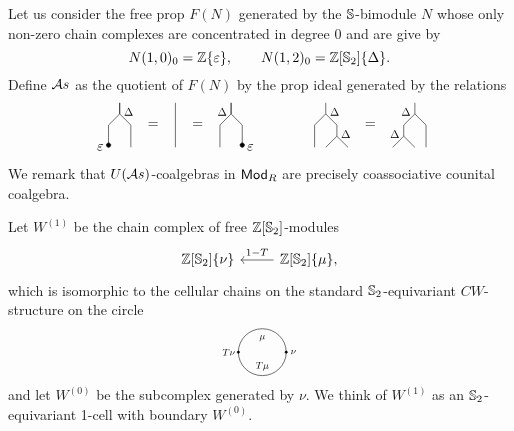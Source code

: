 Let us consider the free prop $F(N)$ generated by the $\S$-bimodule $N$ whose only non-zero chain complexes are concentrated in degree $0$ and are give by
\begin{equation*}
N(1, 0)_0 = \Z\{\varepsilon\}, \qquad
N(1, 2)_0 = \Z[\S_2]\{\Delta\}.
\end{equation*}
Define $\A$ as the quotient of $F(N)$ by the prop ideal generated by the relations
\begin{equation*}
\begin{tikzpicture}[scale=.28]
\draw (-4,0)--(-4,2)--(-5,3)--(-5,4);
\draw (-6,0)--(-6,2)--(-5,3)--(-5,4);
\node [scale=.8] at (-4.2,3.2) {$\Delta$};
\draw [fill] (-6,.2) circle [radius=.2];
\node [left] at (-6,0) {$\varepsilon$};

\node at (-2,2) {=};
\draw (0,0)--(0,4);
\node at (2,2) {=};

\draw (4,0)--(4,2)--(5,3)--(5,4);
\draw (6,0)--(6,2)--(5,3)--(5,4);
\node [scale=.8] at (4.2,3.2) {$\Delta$};
\draw [fill] (6,.2) circle [radius=.2];
\node [right] at (6,0) {$\varepsilon$};
\end{tikzpicture}
\qquad \qquad
\begin{tikzpicture}[scale=.28]
\node at (0,2){=};
\node at (0,0) {\phantom{$\varepsilon$}};

\draw (2,0)--(3,1)--(3,2)--(4,3)--(4,4);
\draw (4,0)--(3,1);
\draw (4,3)--(5,2)--(5,0);
\node [scale=.8] at (3.2,3.2) {$\Delta$};
\node [scale=.8] at (2.2,1.2) {$\Delta$};

\draw (-2,0)--(-3,1)--(-3,2)--(-4,3)--(-4,4);
\draw (-4,0)--(-3,1);
\draw (-4,3)--(-5,2)--(-5,0);
\node [scale=.8] at (-3.2,3.2) {$\Delta$};
\node [scale=.8] at (-2.2,1.2) {$\Delta$};
\end{tikzpicture}
\end{equation*}
We remark that $U(\A)$-coalgebras in $\Ch$ are precisely coassociative counital coalgebra.

Let $W^{(1)}$ be the chain complex of free $\Z[\S_2]$-modules
\begin{equation*}
\begin{tikzcd}
\Z[\S_2]\{\nu\} &[0pt] \arrow[l, "1-T"'] \Z[\S_2]\{\mu\},
\end{tikzcd} 
\end{equation*}
which is isomorphic to the cellular chains on the standard $\S_2$-equivariant $CW$-structure on the circle
\begin{equation*}
\begin{tikzpicture}[scale=.85]
\draw (0,0) circle (20pt);
\node[scale=.7] at (0,12pt){$\mu$};
\node[scale=.7] at (0,-12pt){$T \mu$};
\node[scale=.7] at (-28pt,0){$T \nu$};
\node[scale=.7] at (26pt,0){$\nu$};
\draw [fill] (-20pt,0) circle [radius=1pt];
\draw [fill] (20pt,0) circle [radius=1pt];
\end{tikzpicture}
\end{equation*}
and let $W^{(0)}$ be the subcomplex generated by $\nu$. We think of $W^{(1)}$ as an $\S_2$-equivariant 1-cell with boundary $W^{(0)}$.


